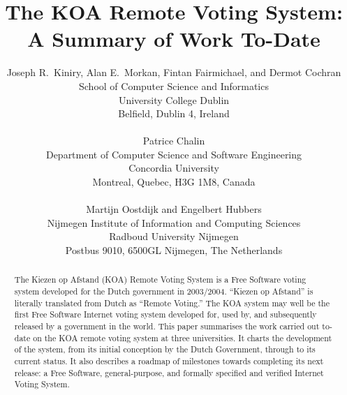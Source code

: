 \documentclass[times, 10pt, twocolumn]{article}
\begin{document}

\pagestyle{empty}


\title{The KOA Remote Voting System:\\
A Summary of Work To-Date}

\author{Joseph R.~Kiniry, Alan E.~Morkan, Fintan Fairmichael, and Dermot Cochran\\
School of Computer Science and Informatics\\
University College Dublin\\
Belfield, Dublin 4, Ireland\\ 
\\
Patrice Chalin\\
Department of Computer Science and Software Engineering\\
Concordia University\\
Montreal, Quebec, H3G 1M8, Canada\\
\\
Martijn Oostdijk and Engelbert Hubbers\\
Nijmegen Institute of Information and Computing Sciences\\
Radboud University Nijmegen\\
Postbus 9010, 6500GL Nijmegen, The Netherlands}

\maketitle

\thispagestyle{empty}
\begin{abstract}

The Kiezen op Afstand (KOA) Remote Voting System is a Free Software voting 
system developed for the Dutch government in 2003/2004. ``Kiezen op Afstand'' 
is literally translated from Dutch as ``Remote Voting.''  The KOA system may 
well be the first Free Software Internet voting system developed for, used by, 
and subsequently released by a government in the world.  This paper summarises 
the work carried out to-date on the KOA remote voting system at three 
universities.  It charts the development of the system, from its initial 
conception by the Dutch Government, through to its current status. It also 
describes a roadmap of milestones towards completing its next release: a Free 
Software, general-purpose, and formally specified and verified Internet Voting 
System.

\end{abstract}
\end{document}
